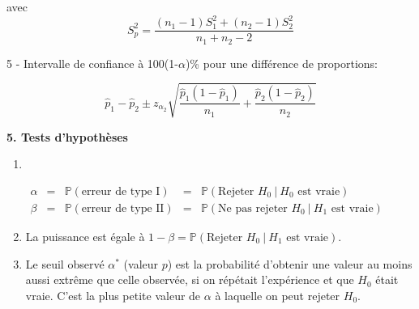 \documentclass [12pt]{article}
\begin{document}
avec $$ S_p^2 = \frac{(n_1-1)S_1^2 + (n_2-1)S_2^2}{n_1 + n_2 - 2} $$

\vspace{0.4in}

5 - Intervalle de confiance à 100(1-$\alpha$)\% pour une différence de proportions: 


$$ \hat{p}_1 - \hat{p}_2  \pm z_{\alpha_2} \sqrt{ \frac{\hat{p}_1(1-\hat{p}_1)}{n_1} + \frac{\hat{p}_2(1-\hat{p}_2)}{n_2}}$$


\vspace{0.2 in}
 {\large\bf 5. Tests d'hypothèses}
\vspace{0.1 in}

\begin{enumerate}
\item[$\bullet$]
$\mbox{ }$
\vspace{-.5cm}

$\begin{array}{cclll}
\alpha
&=& \mathbb{P}\left(\mbox{erreur de type I}\right)
&=& \mathbb{P}\left(\mbox{Rejeter }H_0~|~H_0\mbox{ est vraie}\right)
\\
\beta &=& \mathbb{P}\left(\mbox{erreur de type II}\right) &=&
\mathbb{P}\left(\mbox{Ne pas rejeter }H_0~|~H_1\mbox{ est
vraie}\right)
\end{array}$\\

\item[$\bullet$] La puissance est égale \`a $1-\beta=\mathbb{P}\left(\mbox{Rejeter }H_0~|~H_1\mbox{ est vraie}\right)$. \\
\item[$\bullet$] Le seuil observé $\alpha^*$ (valeur $p$)
est la probabilité d'obtenir une valeur au moins aussi extr\^eme que celle observée, si on répétait l'expérience et que $H_0$ était vraie. C'est la plus petite valeur de $\alpha$ \`a laquelle on peut rejeter $H_0$.
\end{enumerate}
\end{document}
